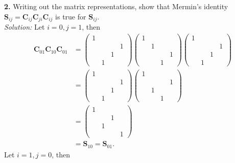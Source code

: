 \documentclass{book}
\theoremstyle{definition}
\newcommand{\nn}{\nonumber}
\begin{document}
\newpage


\noindent \textbf{2.} Writing out the matrix representations, show that Mermin's identity $\mathbf{S}_{ij} = \mathbf{C}_{ij}\mathbf{C}_{ji}\mathbf{C}_{ij}$ is true for $\mathbf{S}_{ij}$.\\



\noindent \textit{Solution:} Let $i=0,j=1$, then 
\begin{align}
\mathbf{C}_{01}\mathbf{C}_{10}\mathbf{C}_{01} &= \begin{pmatrix}
1 &&&\\&&&1\\&&1&\\&1&&
\end{pmatrix}
\begin{pmatrix}
1&&&\\&1&&\\&&&1\\&&1&
\end{pmatrix}
\begin{pmatrix}
1 &&&\\&&&1\\&&1&\\&1&&
\end{pmatrix}\nn\\
&= \begin{pmatrix}
1 &&&\\&&&1\\&&1&\\&1&&
\end{pmatrix}
\begin{pmatrix}
1 &&&\\&&&1\\&1&&\\&&1&
\end{pmatrix}\nn\\
&= \begin{pmatrix}
1&&&\\&&1&\\&1&&\\&&&1
\end{pmatrix}\nn\\
&= \mathbf{S}_{10} = \mathbf{S}_{01}.
\end{align}
Let $i=1,j=0$, then
\end{document}
